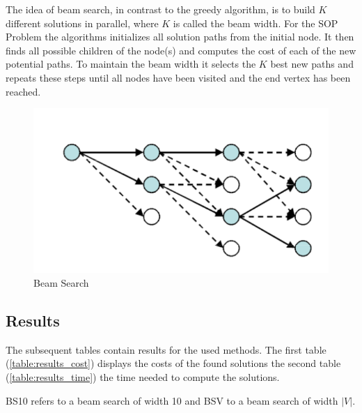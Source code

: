 \documentclass[]{article}
\begin{document}
    The idea of beam search, in contrast to the greedy algorithm, is to build $K$ different solutions in parallel, where $K$ is called the beam width. For the SOP Problem the algorithms initializes all solution paths from the initial node. It then finds all possible children of the node(s) and computes the cost of each of the new potential paths. To maintain the beam width it selects the $K$ best new paths and repeats these steps until all nodes have been visited and the end vertex has been reached. \cite{Beam:1} \cite{Beam:2} 

    \begin{figure}[hbt]
    	\includegraphics[]{files/beam_search.png}
    	\centering
    	\caption{Beam Search}
    \end{figure}


    \subsection{Results}
    \label{results}

    The subsequent tables contain results for the used methods. The first table (\ref{table:results_cost}) displays the costs of the found solutions the second table (\ref{table:results_time}) the time needed to compute the solutions.
    
    BS10 refers to a beam search of width 10 and BSV to a beam search of width $|V|$.
\end{document}
